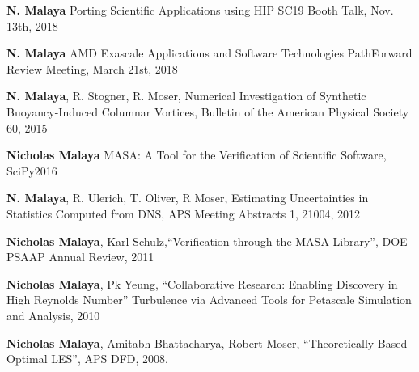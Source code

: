 \textbf{N. Malaya}
Porting Scientific Applications using HIP
SC19 Booth Talk, Nov. 13th, 2018

\blankline

\textbf{N. Malaya}
AMD Exascale Applications and Software Technologies
PathForward Review Meeting, March 21st, 2018

\blankline

\textbf{N. Malaya}, R. Stogner, R. Moser,
Numerical Investigation of Synthetic Buoyancy-Induced Columnar Vortices,
Bulletin of the American Physical Society 60, 2015

\blankline

\textbf{Nicholas Malaya}
MASA: A Tool for the Verification of Scientific Software, SciPy2016
\blankline

\textbf{N. Malaya}, R. Ulerich, T. Oliver, R Moser, Estimating Uncertainties in
Statistics Computed from DNS, APS Meeting Abstracts 1, 21004, 2012 

\blankline

\textbf{Nicholas Malaya}, Karl Schulz,``Verification through the MASA Library'', DOE
PSAAP Annual Review, 2011

\blankline

\textbf{Nicholas Malaya},  Pk Yeung, ``Collaborative Research: Enabling Discovery in High Reynolds Number''
Turbulence via Advanced Tools for Petascale Simulation and Analysis, 2010

\blankline

\textbf{Nicholas Malaya}, Amitabh Bhattacharya, Robert Moser,
``Theoretically Based Optimal LES'', APS DFD, 2008.
